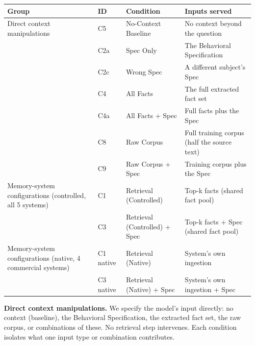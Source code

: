 \begin{longtable}[]{@{}
  >{\raggedright\arraybackslash}p{}
  >{\raggedright\arraybackslash}p{}
  >{\raggedright\arraybackslash}p{}
  >{\raggedright\arraybackslash}p{}@{}}
\toprule
Group & ID & Condition & Inputs served \\
\midrule
\endhead
Direct context manipulations & C5 & No-Context Baseline & No context
beyond the question \\
& C2a & Spec Only & The Behavioral Specification \\
& C2c & Wrong Spec & A different subject's Spec \\
& C4 & All Facts & The full extracted fact set \\
& C4a & All Facts + Spec & Full facts plus the Spec \\
& C8 & Raw Corpus & Full training corpus (half the source text) \\
& C9 & Raw Corpus + Spec & Training corpus plus the Spec \\
Memory-system configurations (controlled, all 5 systems) & C1 &
Retrieval (Controlled) & Top-k facts (shared fact pool) \\
& C3 & Retrieval (Controlled) + Spec & Top-k facts + Spec (shared fact
pool) \\
Memory-system configurations (native, 4 commercial systems) & C1 native
& Retrieval (Native) & System's own ingestion \\
& C3 native & Retrieval (Native) + Spec & System's own ingestion +
Spec \\
\bottomrule
\end{longtable}

\textbf{Direct context manipulations.} We specify the model's input
directly: no context (baseline), the Behavioral Specification, the
extracted fact set, the raw corpus, or combinations of these. No
retrieval step intervenes. Each condition isolates what one input type
or combination contributes.

